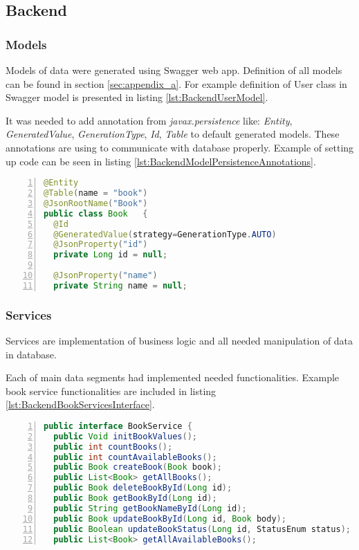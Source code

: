 \subsection{Backend}

\subsubsection{Models}
Models of data were generated using Swagger web app. Definition of all models can be found in section \ref{sec:appendix_a}. For example definition of User class in Swagger model is presented in listing \ref{lst:BackendUserModel}.




It was needed to add annotation from \textit{javax.persistence} like:
\textit{Entity}, \textit{GeneratedValue}, \textit{GenerationType}, \textit{Id}, \textit{Table} to default generated models. These annotations are using to communicate with database properly. Example of setting up code can be seen in listing \ref{lst:BackendModelPersistenceAnnotations}.


\begin{lstlisting}[breaklines=true, numbers=left, stepnumber=1, label={lst:BackendModelPersistenceAnnotations}, caption={Model persistence annotations},language=Java]
@Entity
@Table(name = "book")
@JsonRootName("Book")
public class Book   {
  @Id
  @GeneratedValue(strategy=GenerationType.AUTO)
  @JsonProperty("id")
  private Long id = null;

  @JsonProperty("name")
  private String name = null;
\end{lstlisting}

\subsubsection{Services}
Services are implementation of business logic and all needed manipulation of data in database.

Each of main data segments had implemented needed functionalities. Example book service functionalities are included in listing \ref{lst:BackendBookServicesInterface}. 
\begin{lstlisting}[breaklines=true, numbers=left, stepnumber=1, label={lst:BackendBookServicesInterface}, caption={Book services interface},language=Java]
public interface BookService {
  public Void initBookValues();
  public int countBooks();
  public int countAvailableBooks();
  public Book createBook(Book book);
  public List<Book> getAllBooks();
  public Book deleteBookById(Long id);
  public Book getBookById(Long id);
  public String getBookNameById(Long id);
  public Book updateBookById(Long id, Book body);
  public Boolean updateBookStatus(Long id, StatusEnum status);
  public List<Book> getAllAvailableBooks();
\end{lstlisting}

